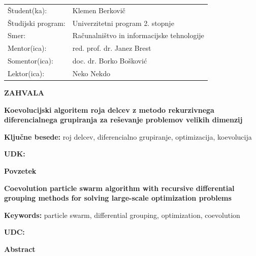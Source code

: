 \documentclass[openany, a4paper, 12pt]{book}
\newcounter{footnotemarknum}
\newcommand{\footnotemarkenv}{\addtocounter{footnotemarknum}{1}\footnotemark}
\newcommand{\aauthor}{Klemen Berkovi\v{c}}
\newcommand{\atitleslo}{Koevolucijski algoritem roja delcev z metodo rekurzivnega diferencialnega grupiranja za reševanje problemov velikih dimenzij}
\newcommand{\atitleen}{Coevolution particle swarm algorithm with recursive differential grouping methods for solving large-scale optimization problems}
\newcommand{\akljucne}{roj delcev, diferencialno grupiranje, optimizacija, koevolucija}
\newcommand{\akeywords}{particle swarm, differential grouping, optimization, coevolution}
\newcommand{\amentor}{red. prof. dr. Janez Brest}
\newcommand{\asomentor}{doc. dr. Borko Bošković}
\newcommand{\alektor}{Neko Nekdo}
\begin{document}
\begin{table}[h]
    \renewcommand{\arraystretch}{1.5}
    \begin{tabular}{ll}
     Študent(ka): & \aauthor \\
     Študijski program: & Univerzitetni program 2. stopnje \\
     Smer: & Računalništvo in informacijske tehnologije \\
     Mentor(ica): & \amentor \\
     Somentor(ica): & \asomentor \\
     Lektor(ica): & \alektor \\
    \end{tabular}
\end{table}

\newpage
\vspace*{8cm}
\hspace{6.2cm}
\begin{minipage}[b]{8.0cm}
\begin{flushright}
    {\Large\textbf{ZAHVALA}}\\ 
\end{flushright}
\vspace{0.3cm}

\end{minipage}
\vfill

\newpage
\textbf{\Large \atitleslo} %
\vspace*{2.0cm}

\textbf{Ključne besede:} \akljucne %
\vspace*{2.0cm}

\textbf{UDK:} %
\vspace*{2.0cm}

\textbf{Povzetek} %
\\


\newpage
\begin{otherlanguage}{english}
\textbf{\Large \atitleen} %
\vspace*{2.0cm}

\textbf{Keywords:} \akeywords %
\vspace*{2.0cm}

\textbf{UDC:} %
\vspace*{2.0cm}

\textbf{Abstract} %
\\

\end{otherlanguage}
\end{document}
